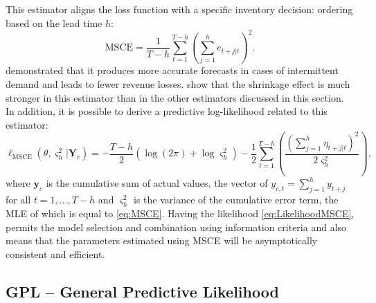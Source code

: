 \documentclass[]{book}
\theoremstyle{definition}
\theoremstyle{definition}
\theoremstyle{definition}
\theoremstyle{definition}
\theoremstyle{remark}
\begin{document}
This estimator aligns the loss function with a specific inventory decision: ordering based on the lead time \(h\):
\begin{equation}
    \mathrm{MSCE} = \frac{1}{T-h} \sum_{t=1}^{T-h} \left( \sum_{j=1}^h e_{t+j|t} \right)^2 .
  \label{eq:MSCE}
\end{equation}
\citet{kourentzes2019unconstraining} demonstrated that it produces more accurate forecasts in cases of intermittent demand and leads to fewer revenue losses. \citet{Svetunkov2020Multistep} show that the shrinkage effect is much stronger in this estimator than in the other estimators discussed in this section. In addition, it is possible to derive a predictive log-likelihood related to this estimator:
\begin{equation}
    \ell_{\mathrm{MSCE}}(\theta, {\varsigma^2_h} | \mathbf{Y}_c) = -\frac{T-h}{2} \left( \log(2 \pi) + \log {\varsigma^2_h} \right) -\frac{1}{2} \sum_{t=1}^{T-h} \left( \frac{\left(\sum_{j=1}^h \eta_{t+j|t}\right)^2}{2 {\varsigma^2_h}} \right) ,
  \label{eq:LikelihoodMSCE}
\end{equation}
where \(\mathbf{y}_c\) is the cumulative sum of actual values, the vector of \(y_{c,t}=\sum_{j=1}^h y_{t+j}\) for all \(t=1, \ldots, T-h\) and \({\varsigma^2_h}\) is the variance of the cumulative error term, the MLE of which is equal to \eqref{eq:MSCE}. Having the likelihood \eqref{eq:LikelihoodMSCE}, permits the model selection and combination using information criteria \citep[Section 13.4][]{SvetunkovSBA} and also means that the parameters estimated using MSCE will be asymptotically consistent and efficient.

\hypertarget{gpl-general-predictive-likelihood}{%
\subsection{GPL -- General Predictive Likelihood}\label{gpl-general-predictive-likelihood}}
\end{document}
